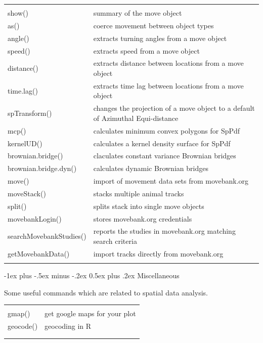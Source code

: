 \documentclass[10pt,landscape]{article}
\makeatletter
\renewcommand{\section}{\@startsection{section}{1}{0mm}%
                                {-1ex plus -.5ex minus -.2ex}%
                                {0.5ex plus .2ex}%
                                {\normalfont\large\bfseries}}
\makeatother
\begin{document}
\begin{multicols}{3}
\begin{tabular}{@{}p{\the\MyLen}%
                @{}p{\linewidth-\the\MyLen}@{}}
                & \\
show() & summary of the move object \\
as() & coerce movement between object types \\
angle() &  extracts turning angles from a move object\\
speed() & extracts speed from a move object \\  
distance() & extracts distance between locations from a move object \\
time.lag() & extracts time lag between locations from a move object \\
spTransform() & changes the projection of a move object to a default of Azimuthal Equi-distance \\
mcp() & calculates minimum convex polygons for SpPdf \\
kernelUD() & calculates a kernel density surface for SpPdf \\
brownian.bridge() & claculates constant variance Brownian bridges \\
brownian.bridge.dyn() & calculates dynamic Brownian bridges \\
move() & import of movement data sets from movebank.org  \\
moveStack() & stacks multiple animal tracks \\
split() & splits stack into single move objects \\
movebankLogin() & stores movebank.org credentials \\
searchMovebankStudies() & reports the studies in movebank.org matching search criteria\\
getMovebankData() & import tracks directly from movebank.org \\

& 

\end{tabular}




\section{Miscellaneous}

Some useful commands which are related to spatial data analysis.


\begin{tabular}{@{}p{\the\MyLen}%
                @{}p{\linewidth-\the\MyLen}@{}}
                & \\
gmap() & get google maps for your plot \\
geocode() & geocoding in R \\
 &  \\
 &  \\


\end{tabular}
\end{multicols}
\end{document}
